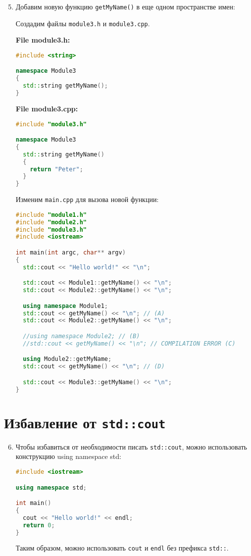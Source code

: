 \documentclass{article}
\begin{document}
\begin{enumerate}
    \setcounter{enumi}{4}
    \item Добавим новую функцию \lstinline|getMyName()| в еще одном пространстве имен:

    Создадим файлы \texttt{module3.h} и \texttt{module3.cpp}.

    \textbf{File module3.h:}
    \begin{lstlisting}[language=C++]
#include <string>

namespace Module3
{
  std::string getMyName();
}
    \end{lstlisting}

    \textbf{File module3.cpp:}
    \begin{lstlisting}[language=C++]
#include "module3.h"

namespace Module3
{
  std::string getMyName()
  {
    return "Peter";
  }
}
    \end{lstlisting}

    Изменим \texttt{main.cpp} для вызова новой функции:
    \begin{lstlisting}[language=C++]
#include "module1.h"
#include "module2.h"
#include "module3.h"
#include <iostream>

int main(int argc, char** argv)
{
  std::cout << "Hello world!" << "\n";

  std::cout << Module1::getMyName() << "\n";
  std::cout << Module2::getMyName() << "\n";

  using namespace Module1;
  std::cout << getMyName() << "\n"; // (A)
  std::cout << Module2::getMyName() << "\n";

  //using namespace Module2; // (B)
  //std::cout << getMyName() << "\n"; // COMPILATION ERROR (C)

  using Module2::getMyName;
  std::cout << getMyName() << "\n"; // (D)

  std::cout << Module3::getMyName() << "\n";
}
    \end{lstlisting}
\end{enumerate}

\section*{Избавление от \texttt{std::cout}}

\begin{enumerate}
    \setcounter{enumi}{5}
    \item Чтобы избавиться от необходимости писать \texttt{std::cout}, можно использовать конструкцию using namespace std:
    \begin{lstlisting}[language=C++]
#include <iostream>

using namespace std;

int main()
{
  cout << "Hello world!" << endl;
  return 0;
}
    \end{lstlisting}

    Таким образом, можно использовать \texttt{cout} и \texttt{endl} без префикса \texttt{std::}.
\end{enumerate}
\end{document}
